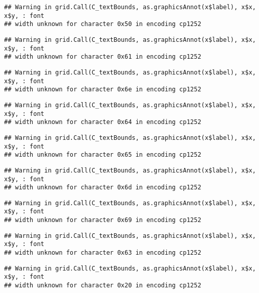 \documentclass[
]{article}
\begin{document}
\begin{verbatim}
## Warning in grid.Call(C_textBounds, as.graphicsAnnot(x$label), x$x, x$y, : font
## width unknown for character 0x50 in encoding cp1252
\end{verbatim}

\begin{verbatim}
## Warning in grid.Call(C_textBounds, as.graphicsAnnot(x$label), x$x, x$y, : font
## width unknown for character 0x61 in encoding cp1252
\end{verbatim}

\begin{verbatim}
## Warning in grid.Call(C_textBounds, as.graphicsAnnot(x$label), x$x, x$y, : font
## width unknown for character 0x6e in encoding cp1252
\end{verbatim}

\begin{verbatim}
## Warning in grid.Call(C_textBounds, as.graphicsAnnot(x$label), x$x, x$y, : font
## width unknown for character 0x64 in encoding cp1252
\end{verbatim}

\begin{verbatim}
## Warning in grid.Call(C_textBounds, as.graphicsAnnot(x$label), x$x, x$y, : font
## width unknown for character 0x65 in encoding cp1252
\end{verbatim}

\begin{verbatim}
## Warning in grid.Call(C_textBounds, as.graphicsAnnot(x$label), x$x, x$y, : font
## width unknown for character 0x6d in encoding cp1252
\end{verbatim}

\begin{verbatim}
## Warning in grid.Call(C_textBounds, as.graphicsAnnot(x$label), x$x, x$y, : font
## width unknown for character 0x69 in encoding cp1252
\end{verbatim}

\begin{verbatim}
## Warning in grid.Call(C_textBounds, as.graphicsAnnot(x$label), x$x, x$y, : font
## width unknown for character 0x63 in encoding cp1252
\end{verbatim}

\begin{verbatim}
## Warning in grid.Call(C_textBounds, as.graphicsAnnot(x$label), x$x, x$y, : font
## width unknown for character 0x20 in encoding cp1252
\end{verbatim}
\end{document}
